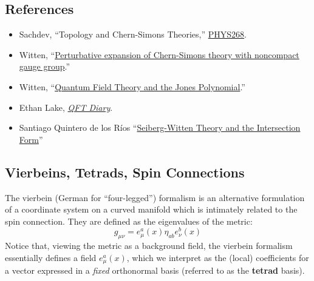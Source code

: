 \documentclass{report}
\begin{document}
\subsection*{References}
\begin{itemize}[nosep]
\item Sachdev, ``Topology and Chern-Simons Theories,''
	\href{http://qpt.physics.harvard.edu/phys268/}{PHYS268}.
\item Witten, ``\href{https://projecteuclid.org/journals/communications-in-mathematical-physics/volume-141/issue-2/Perturbative-expansion-of-Chern-Simons-theory-with-noncompact-gauge-group/cmp/1104248307.full}{Perturbative expansion of Chern-Simons theory with noncompact gauge group}.''
\item Witten, ``\href{https://projecteuclid.org/journals/communications-in-mathematical-physics/volume-121/issue-3/Quantum-field-theory-and-the-Jones-polynomial/cmp/1104178138.full}{Quantum Field Theory and the Jones Polynomial}.''
\item Ethan Lake, \href{https://drive.google.com/file/d/1wNJaNX1Ef1hrOly-TET8yKG2rx7mcaH0/view}{\textit{QFT Diary}}.
\item Santiago Quintero de los R\'ios
``\href{https://webspace.science.uu.nl/~caval101/homepage/Students_files/QuinteroMaster.pdf}{Seiberg-Witten
Theory and the Intersection Form}''
\end{itemize}

\subsection{Vierbeins, Tetrads, Spin Connections}
The vierbein (German for ``four-legged'') formalism is an alternative formulation
of a coordinate system on a curved manifold which is intimately related to the
spin connection. They are defined as the eigenvalues of the metric: 
\begin{equation*}
	g_{\mu\nu} = e_\mu^a (x) \eta_{ab} e_{\nu}^{b}(x)
\end{equation*}
Notice that, viewing the metric as a background field, the vierbein formalism 
essentially defines a field $ e^{a}_\mu(x) $, which we interpret as the (local)
coefficients for a vector expressed in a \textit{fixed} orthonormal basis 
(referred to as the \textbf{tetrad} basis). 
\end{document}
